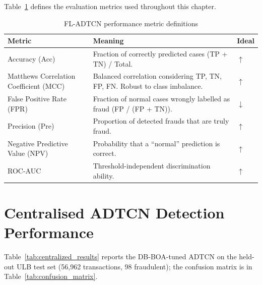Table~\ref{tab:fl_adtcn_metric_defs} defines the evaluation metrics used throughout this chapter.

\begin{table}[H]
\centering
\caption{FL-ADTCN performance metric definitions}
\label{tab:fl_adtcn_metric_defs}
\begin{tabular}{|p{2.9cm}|p{8.3cm}|p{2.3cm}|}
\hline
\textbf{Metric} & \textbf{Meaning} & \textbf{Ideal} \\ \hline
Accuracy (Acc) & Fraction of correctly predicted cases (TP + TN) / Total. & $\uparrow$ \\ \hline
Matthews Correlation Coefficient (MCC) & Balanced correlation considering TP, TN, FP, FN. Robust to class imbalance. & $\uparrow$ \\ \hline
False Positive Rate (FPR) & Fraction of normal cases wrongly labelled as fraud (FP / (FP + TN)). & $\downarrow$ \\ \hline
Precision (Pre) & Proportion of detected frauds that are truly fraud. & $\uparrow$ \\ \hline
Negative Predictive Value (NPV) & Probability that a ``normal'' prediction is correct. & $\uparrow$ \\ \hline
ROC-AUC & Threshold-independent discrimination ability. & $\uparrow$ \\ \hline
\end{tabular}
\end{table}

\FloatBarrier

\section{Centralised ADTCN Detection Performance}
\label{sec:centralised}

Table~\ref{tab:centralized_results} reports the DB-BOA-tuned ADTCN on the held-out ULB test set (56{,}962 transactions, 98 fraudulent); the confusion matrix is in Table~\ref{tab:confusion_matrix}.

